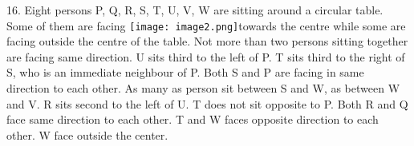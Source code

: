 \documentclass[
]{article}
\begin{document}
16. Eight persons P, Q, R, S, T, U, V, W are sitting around a circular table. Some of them are
facing \texttt{[image: image2.png]}towards the centre while some are facing outside the centre of the table. Not more
than two persons sitting together are facing same direction. U sits third to the left of P. T sits
third to the right of S, who is an immediate neighbour of P. Both S and P are facing in same
direction to each other. As many as person sit between S and W, as between W and V. R sits
second to the left of U. T does not sit opposite to P. Both R and Q face same direction to each
other. T and W faces opposite direction to each other. W face outside the center.\\
\end{document}

